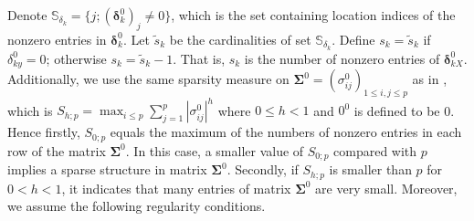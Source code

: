 \documentclass[12pt]{article}
\begin{document}
Denote $\mathbb{S}_{\delta_k} = \{j; (\bm \delta_k^0)_j \neq 0 \}$, which is the set containing location indices of the nonzero entries in $\bm \delta_k^0$.
Let $\tilde{s}_k$ be the cardinalities of set $\mathbb{S}_{\delta_k}$.
Define $s_k = \tilde{s}_k$ if $\delta_{ky}^0 = 0$; otherwise $s_k = \tilde{s}_k - 1$.
That is, $s_k$ is the number of nonzero entries of $\bm \delta_{kX}^0$.
Additionally, we use the same sparsity measure on $\bm \Sigma^0 = (\sigma_{ij}^0)_{1 \leq i, j \leq p}$ as in \cite{Bickel2008Covariance}, which is $S_{h;p} = \max_{i \leq p} \sum_{j=1}^{p} |\sigma_{ij}^0|^h$
where $0 \leq h < 1$ and $0^0$ is defined to be 0.
Hence firstly, $S_{0;p}$ equals the maximum of the numbers of nonzero entries in each row of the matrix $\bm \Sigma^0$.
In this case, a smaller value of $S_{0;p}$ compared with $p$ implies a sparse structure in matrix $\bm \Sigma^0$.
Secondly, if $S_{h;p}$ is smaller than $p$ for $0 < h < 1$, it indicates that many entries of matrix $\bm \Sigma^0$ are very small.
Moreover, we assume the following regularity conditions.
\end{document}
